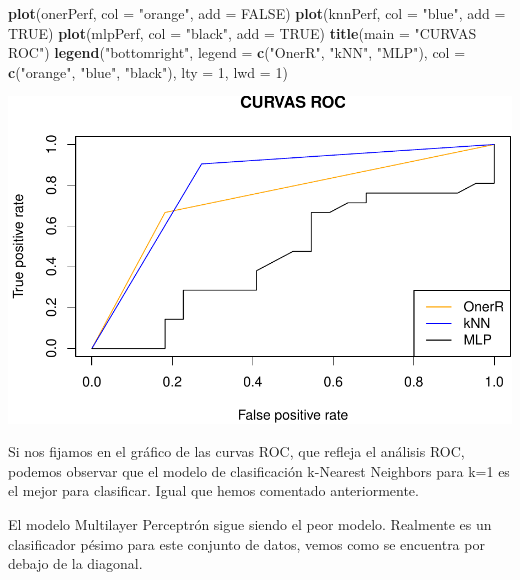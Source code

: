\documentclass[]{article}
\newenvironment{Shaded}{\begin{snugshade}}{\end{snugshade}}
\newcommand{\DataTypeTok}[1]{\textcolor[rgb]{0.13,0.29,0.53}{#1}}
\newcommand{\DecValTok}[1]{\textcolor[rgb]{0.00,0.00,0.81}{#1}}
\newcommand{\KeywordTok}[1]{\textcolor[rgb]{0.13,0.29,0.53}{\textbf{#1}}}
\newcommand{\NormalTok}[1]{#1}
\newcommand{\OtherTok}[1]{\textcolor[rgb]{0.56,0.35,0.01}{#1}}
\newcommand{\StringTok}[1]{\textcolor[rgb]{0.31,0.60,0.02}{#1}}
\begin{document}
\begin{Shaded}
\begin{Highlighting}[]
\KeywordTok{plot}\NormalTok{(onerPerf, }\DataTypeTok{col =} \StringTok{"orange"}\NormalTok{, }\DataTypeTok{add =} \OtherTok{FALSE}\NormalTok{)}
\KeywordTok{plot}\NormalTok{(knnPerf, }\DataTypeTok{col =} \StringTok{"blue"}\NormalTok{, }\DataTypeTok{add =} \OtherTok{TRUE}\NormalTok{)}
\KeywordTok{plot}\NormalTok{(mlpPerf, }\DataTypeTok{col =} \StringTok{"black"}\NormalTok{, }\DataTypeTok{add =} \OtherTok{TRUE}\NormalTok{)}
\KeywordTok{title}\NormalTok{(}\DataTypeTok{main =} \StringTok{"CURVAS ROC"}\NormalTok{)}
\KeywordTok{legend}\NormalTok{(}\StringTok{"bottomright"}\NormalTok{, }\DataTypeTok{legend =} \KeywordTok{c}\NormalTok{(}\StringTok{"OnerR"}\NormalTok{, }\StringTok{"kNN"}\NormalTok{, }\StringTok{"MLP"}\NormalTok{), }
	\DataTypeTok{col =} \KeywordTok{c}\NormalTok{(}\StringTok{"orange"}\NormalTok{, }\StringTok{"blue"}\NormalTok{, }\StringTok{"black"}\NormalTok{), }
	\DataTypeTok{lty =} \DecValTok{1}\NormalTok{, }\DataTypeTok{lwd =} \DecValTok{1}\NormalTok{)}
\end{Highlighting}
\end{Shaded}

\includegraphics{document_files/figure-latex/unnamed-chunk-12-1.pdf}

\newpage

Si nos fijamos en el gráfico de las curvas ROC, que refleja el análisis ROC, podemos observar que el modelo de clasificación k-Nearest Neighbors para k=1 es el mejor para clasificar. Igual que hemos comentado anteriormente. 

El modelo Multilayer Perceptrón sigue siendo el peor modelo. Realmente es un clasificador pésimo para este conjunto de datos, vemos como se encuentra por debajo de la diagonal.
\end{document}
